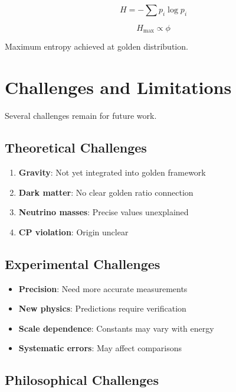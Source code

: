 \begin{equation}
H = -\sum p_i \log p_i
\end{equation}

\begin{theorem}
\label{fa_32:thm:golden-entropy}
\begin{equation}
H_{\max} \propto \phi
\end{equation}

Maximum entropy achieved at golden distribution.
\end{theorem}

\section{Challenges and Limitations}

Several challenges remain for future work.

\subsection{Theoretical Challenges}

\begin{enumerate}
    \item \textbf{Gravity}: Not yet integrated into golden framework
    \item \textbf{Dark matter}: No clear golden ratio connection
    \item \textbf{Neutrino masses}: Precise values unexplained
    \item \textbf{CP violation}: Origin unclear
\end{enumerate}

\subsection{Experimental Challenges}

\begin{itemize}
    \item \textbf{Precision}: Need more accurate measurements
    \item \textbf{New physics}: Predictions require verification
    \item \textbf{Scale dependence}: Constants may vary with energy
    \item \textbf{Systematic errors}: May affect comparisons
\end{itemize}

\subsection{Philosophical Challenges}

